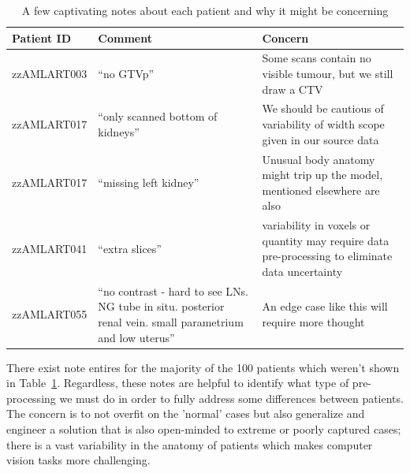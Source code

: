 \documentclass[11pt,twoside]{report}
\begin{document}
\begin{table}[ht]
  \centering
  \begin{tabular}{>{\raggedright}p{3cm}p{6cm}p{6cm}}
    \toprule
    \textbf{Patient ID} & \textbf{Comment}                                                                                           & \textbf{Concern}                                                                                \\
    \midrule
    zzAMLART003         & ``no GTVp''                                                                                                & Some scans contain no visible tumour, but we still draw a CTV                                   \\
    \midrule
    zzAMLART017         & ``only scanned bottom of kidneys''                                                                         & We should be cautious of variability of width scope given in our source data                    \\
    \midrule
    zzAMLART017         & ``missing left kidney''                                                                                    & Unusual body anatomy might trip up the model, mentioned elsewhere are also                      \\
    \midrule
    zzAMLART041         & ``extra slices''                                                                                           & variability in voxels or quantity may require data pre-processing to eliminate data uncertainty \\
    \midrule
    zzAMLART055         & ``no contrast - hard to see LNs. NG tube in situ. posterior renal vein. small parametrium and low uterus'' & An edge case like this will require more thought                                                \\
    \bottomrule
  \end{tabular}
  \caption{A few captivating notes about each patient and why it might be concerning}
 \label{tab:notes-summary}
\end{table}

There exist note entires for the majority of the 100 patients which weren't shown in Table~\ref{tab:notes-summary}. Regardless, these notes are helpful to identify what type of pre-processing we must do in order to fully address some differences between patients. The concern is to not overfit on the 'normal' cases but also generalize and engineer a solution that is also open-minded to extreme or poorly captured cases; there is a vast variability in the anatomy of patients which makes computer vision tasks more challenging.
\end{document}
